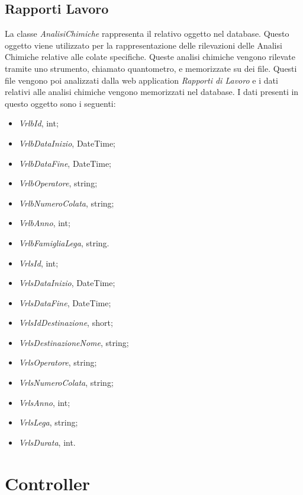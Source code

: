  \subsection{Rapporti Lavoro}
  La classe \textit{AnalisiChimiche} rappresenta il relativo oggetto nel database. Questo oggetto viene utilizzato per la
  rappresentazione delle rilevazioni delle Analisi Chimiche relative alle colate specifiche. Queste analisi chimiche vengono
  rilevate tramite uno strumento, chiamato quantometro, e memorizzate su dei file. Questi file vengono poi analizzati dalla
  web application \textit{Rapporti di Lavoro} e i dati relativi alle analisi chimiche vengono memorizzati nel database. I dati
  presenti in questo oggetto sono i seguenti:
  \begin{itemize}
    \item \textit{VrlbId}, int;
    \item \textit{VrlbDataInizio}, DateTime;
    \item \textit{VrlbDataFine}, DateTime;
    \item \textit{VrlbOperatore}, string;
    \item \textit{VrlbNumeroColata}, string;
    \item \textit{VrlbAnno}, int;
    \item \textit{VrlbFamigliaLega}, string.
  \end{itemize}
  
  \begin{itemize}
    \item \textit{VrlsId}, int;
    \item \textit{VrlsDataInizio}, DateTime;
    \item \textit{VrlsDataFine}, DateTime;
    \item \textit{VrlsIdDestinazione}, short;
    \item \textit{VrlsDestinazioneNome}, string;
    \item \textit{VrlsOperatore}, string;
    \item \textit{VrlsNumeroColata}, string;
    \item \textit{VrlsAnno}, int;
    \item \textit{VrlsLega}, string;
    \item \textit{VrlsDurata}, int.
  \end{itemize}
  
  
  \section{Controller}
